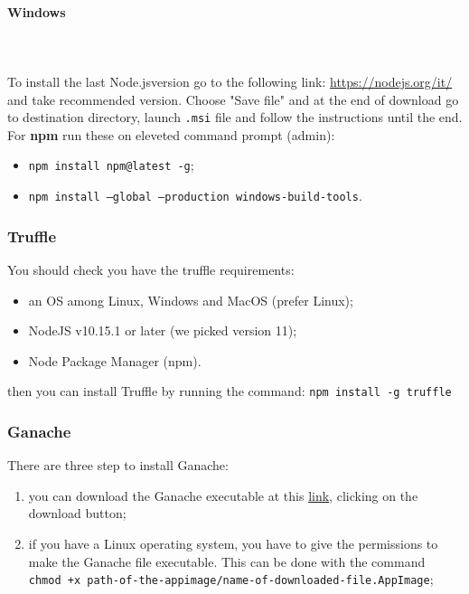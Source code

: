 \paragraph{Windows} \mbox{} \\ \mbox{} \\
To install the last Node.js\glosp version go to the following link: \url{https://nodejs.org/it/} and take recommended version.
Choose "Save file" and at the end of download go to destination directory, launch \texttt{.msi} file and follow the instructions until the end.
For \textbf{npm} run these on eleveted command prompt (admin):
\begin{itemize}
	\item \texttt{npm install npm@latest -g};
	\item \texttt{npm install ---global ---production windows-build-tools}.
\end{itemize}

\subsubsection{Truffle}
You should check you have the truffle requirements:
\begin{itemize}
	\item an OS among Linux, Windows and MacOS (prefer Linux);
	\item NodeJS v10.15.1 or later (we picked version 11);
	\item Node Package Manager (npm\glo).
\end{itemize}
then you can install Truffle by running the command: \texttt{npm install -g truffle}


\subsubsection{Ganache}
There are three step to install Ganache:
\begin{enumerate}
	\item you can download the Ganache executable at this \href{https://truffleframework.com/ganache}{link}, clicking on the download button;
	\item if you have a Linux operating system, you have to give the permissions to make the Ganache file executable. This can be done with the command \\\texttt{chmod +x path-of-the-appimage/name-of-downloaded-file.AppImage};
\end{enumerate}

